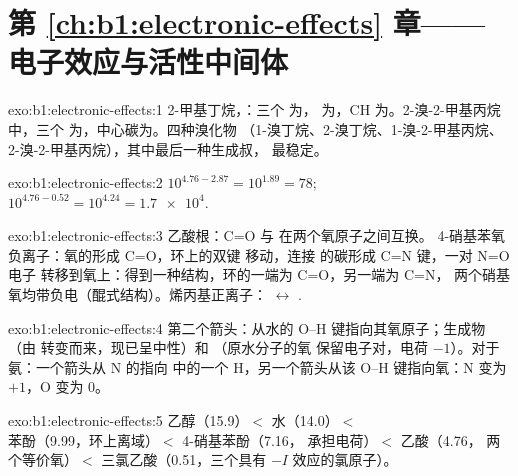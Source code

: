 \section*{第 \ref{ch:b1:electronic-effects} 章——电子效应与活性中间体}

\begin{solution}{exo:b1:electronic-effects:1}
2-甲基丁烷，：三个  为，
 为，CH 为。2-溴-2-甲基丙烷中，三个
 为，中心碳为。四种溴化物
（1-溴丁烷、2-溴丁烷、1-溴-2-甲基丙烷、
2-溴-2-甲基丙烷），其中最后一种生成叔，
最稳定。
\end{solution}

\begin{solution}{exo:b1:electronic-effects:2}
$10^{4.76 - 2.87} = 10^{1.89} = 78$; $10^{4.76 - 0.52} = 10^{4.24} =
\num{1.7e4}$.
\end{solution}

\begin{solution}{exo:b1:electronic-effects:3}
乙酸根：C=O 与  在两个氧原子之间互换。
4-硝基苯氧负离子：氧的形成 C=O，环上的双键
移动，连接  的碳形成 C=N 键，一对 N=O 电子
转移到氧上：得到一种结构，环的一端为 C=O，另一端为 C=N，
两个硝基氧均带负电（醌式结构）。烯丙基正离子：
 $\leftrightarrow$ .
\end{solution}

\begin{solution}{exo:b1:electronic-effects:4}
第二个箭头：从水的 O--H 键指向其氧原子；生成物 
（由  转变而来，现已呈中性）和 （原水分子的氧
保留电子对，电荷 $-1$）。对于氨：一个箭头从 N 的指向
 中的一个 H，另一个箭头从该 O--H 键指向氧：N 变为
$+1$，O 变为 0。
\end{solution}

\begin{solution}{exo:b1:electronic-effects:5}
乙醇（15.9）$<$ 水（14.0）$<$ 苯酚（9.99，环上离域）$<$
4-硝基苯酚（7.16， 承担电荷）$<$ 乙酸（4.76，
两个等价氧）$<$ 三氯乙酸（0.51，三个具有 $-I$
效应的氯原子）。
\end{solution}

